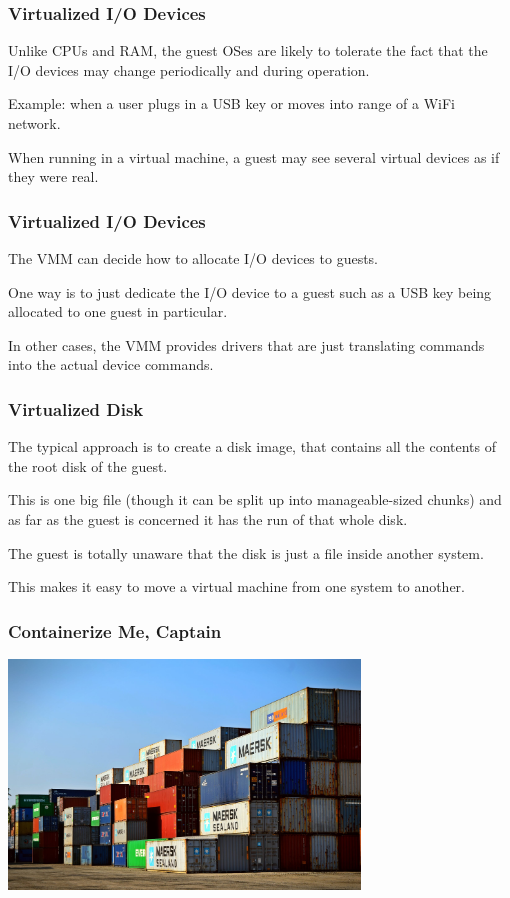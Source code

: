 \begin{frame}
\frametitle{Virtualized I/O Devices}

Unlike CPUs and RAM, the guest OSes are likely to tolerate the fact that the I/O devices may change periodically and during operation.

Example: when a user plugs in a USB key or moves into range of a WiFi network. 

When running in a virtual machine, a guest may see several virtual devices as if they were real.


\end{frame}

\begin{frame}
\frametitle{Virtualized I/O Devices}

The VMM can decide how to allocate I/O devices to guests. 

One way is to just dedicate the I/O device to a guest such as a USB key being allocated to one guest in particular. 

In other cases, the VMM provides drivers that are just translating commands into the actual device commands. 

\end{frame}

\begin{frame}
\frametitle{Virtualized Disk}

The typical approach is to create a \alert{disk image}, that contains all the contents of the root disk of the guest. 

This is one big file (though it can be split up into manageable-sized chunks) and as far as the guest is concerned it has the run of that whole disk.

The guest is totally unaware that the disk is just a file inside another system. 

This makes it easy to move a virtual machine from one system to another.
\end{frame}

\begin{frame}
\frametitle{Containerize Me, Captain}

\begin{center}
	\includegraphics[width=0.7\textwidth]{images/container.jpeg}
\end{center}

\end{frame}


